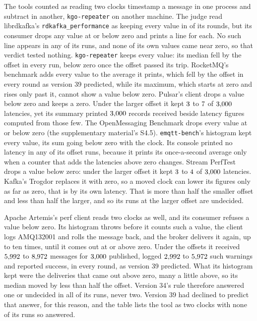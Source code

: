 \documentclass[10pt,journal,onecolumn]{IEEEtran}
\newcommand{\kafka}{Kafka}
\begin{document}
The \toolsTwoClockWord{} tools counted as reading two clocks timestamp a message in one process and
subtract in another, \texttt{kgo-repeater} on another machine. The judge read
librdkafka's \texttt{rdkafka\_performance} as keeping every value in \toolsKeepsRoundsWord{} of
its \toolsRoundsWord{} rounds, but its consumer drops any value at or below zero and prints a line
for each. No such line appears in any of its runs, and none of its own values came near zero, so
that verdict tested nothing. \texttt{kgo-repeater} keeps every value: its median fell by the
offset in every run, below zero once the offset passed its trip. RocketMQ's benchmark adds every
value to the average it prints, which fell by the offset in every round as version 39 predicted,
while its maximum, which starts at zero and rises only past it, cannot show a value below zero.
Pulsar's client drops a value below zero and keeps a zero. Under the
larger offset it kept $3$ to $7$ of $3{,}000$
latencies, yet its summary printed $3{,}000$ records received beside latency figures
computed from those few. The OpenMessaging Benchmark drops every value at or below zero (the supplementary material's S4.5).
\texttt{emqtt-bench}'s histogram kept every value, its sum going below zero with the clock. Its
console printed no latency in any of its offset runs, because it prints its once-a-second average
only when a counter that adds the latencies above zero changes. Stream PerfTest drops a value below
zero: under the larger offset it kept $3$ to $4$ of
$3{,}000$ latencies. \kafka{}'s Trogdor replaces it with zero, so a moved clock can lower
its figures only as far as zero, that is by its own latency. That is more than half the smaller
offset and less than half the larger, and so its runs at the larger offset are undecided.

Apache Artemis's perf client reads two clocks as well, and its consumer refuses a value below
zero. Its histogram throws before it counts such a value, the client logs AMQ132001 and rolls the
message back, and the broker delivers it again, up to ten times, until it comes out at or above
zero. Under the offsets it received $5{,}992$ to $8{,}972$
messages for $3{,}000$ published, logged $2{,}992$ to $5{,}972$
such warnings and reported success, in every round, as version 39 predicted. What its histogram
kept were the deliveries that came out above zero, many a little above, so its median moved by
less than half the offset. Version 34's rule therefore answered one or undecided in all
\toolsArtemisRunsWord{} of its runs, never two. Version 39 had declined to predict that answer, for
this reason, and the table lists the tool as two clocks with none of its runs so
answered.
\end{document}
